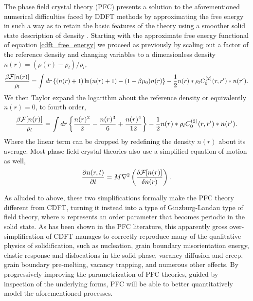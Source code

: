 The phase field crystal theory (PFC) presents a solution to the aforementioned
numerical difficulties faced by DDFT methods by approximating the free energy
in such a way as to retain the basic features of the theory using a smoother
solid state description of density . Starting with the approximate free energy
functional of equation \ref{cdft_free_energy} we proceed as previously by
scaling out a factor of the reference density and changing variables to a
dimensionless density $n(r) = (\rho(r) - \rho_l) / \rho_l$,
%
\begin{equation}
    \frac{\beta \mathcal{F}[n(r)]}{\rho_l} = 
        \int dr \left\lbrace (n(r) + 1) \ln( n(r) + 1) - (1 - \beta\mu_0)n(r) \right\rbrace
        - \frac{1}{2} n(r) \ast \rho_l C^{(2)}_0(r, r^\prime) \ast n(r^\prime).
\end{equation}
%
We then Taylor expand the logarithm about the reference density or equivalently
$n(r) = 0$, to fourth order,
%
\begin{equation}
    \label{pfc_free_energy} 
    \frac{\beta \mathcal{F}[n(r)]}{\rho_l} =
        \int dr \left\lbrace \frac{n(r)^2}{2} - \frac{n(r)^3}{6} + \frac{n(r)^4}{12} \right\rbrace
        -\frac{1}{2} n(r) \ast \rho_l C^{(2)}_0(r, r^\prime) \ast n(r^\prime).
\end{equation}
%
Where the linear term can be dropped by redefining the density $n(r)$ about its
average. Most phase field crystal theories also use a simplified equation of
motion as well,
%
\begin{equation}
    \label{pfc_eom}
    \frac{\partial n(r, t)}{\partial t} = M \nabla^2 \left(\frac{\delta \mathcal{F}[n(r)]}{\delta n(r)}\right).
\end{equation}
%

As alluded to above, these two simplifications formally make the PFC theory
different from CDFT, turning it instead into a type of Ginzburg-Landau type of
field theory, where $n$ represents an order parameter that becomes periodic in
the solid state. As has been shown in the PFC literature, this apparently gross
over-simplification of CDFT manages to correctly reproduce many of the
qualitative physics of solidification, such as nucleation, grain boundary
misorientation energy, elastic response and dislocations in the solid phase,
vacancy diffusion and creep, grain boundary pre-melting, vacancy trapping, and
numerous other effects. By progressively improving the parametrization of PFC
theories, guided by inspection of the underlying forms, PFC will be able to
better quantitatively model the aforementioned processes.

